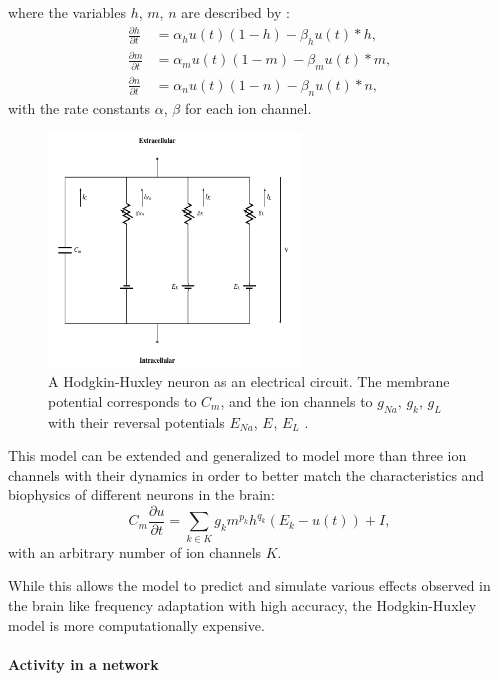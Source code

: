 where the variables $h$, $m$, $n$ are described by :
\[
\begin{split}
	\frac{\partial h}{\partial t} &= \alpha_h u(t) (1-h) - \beta_h u(t) * h , \\
	\frac{\partial m}{\partial t} &= \alpha_m u(t) (1-m) - \beta_m u(t) * m , \\
	\frac{\partial n}{\partial t} &= \alpha_n u(t) (1-n) - \beta_n u(t) * n ,
\end{split}
\]
with the rate constants $\alpha$, $\beta$ for each ion channel.

\begin{figure}
	\centering
    	\includegraphics[width=0.6\textwidth]{imgs/hode_hux.png} 
    \caption[A Hodgkin-Huxley neuron as an electrical circuit.]{A Hodgkin-Huxley neuron as an electrical circuit. The membrane potential corresponds to $C_m$, and the ion channels to $g_{Na}$, $g_{k}$, $g_{L}$ with their reversal potentials $E_{Na}$, $E_{}$, $E_{L}$ \cite{heikoMA}.}
	\label{fig:hogdehux}
\end{figure}

This model can be extended and generalized to model more than three ion channels with their dynamics in order to better match the characteristics and biophysics of different neurons in the brain:
\[
C_m \frac{\partial u}{\partial t} = \sum_{k \in K} g_k m^{p_k} h^{q_k} (E_k - u(t)) + I,
\]
with an arbitrary number of ion channels $K$.

While this allows the model to predict and simulate various effects observed in the brain like frequency adaptation with high accuracy, the Hodgkin-Huxley model is more computationally expensive.

\paragraph{Activity in a network} \label{c:poissonspikes}

